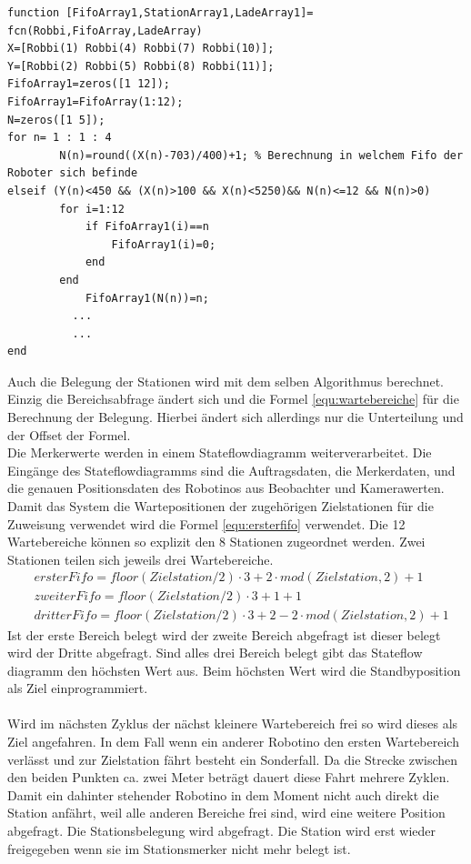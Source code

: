 \newpage
\begin{lstlisting}[caption={FIFO Merker},label=Fifomerker,basicstyle=\small]
function [FifoArray1,StationArray1,LadeArray1]= fcn(Robbi,FifoArray,LadeArray)
X=[Robbi(1) Robbi(4) Robbi(7) Robbi(10)];
Y=[Robbi(2) Robbi(5) Robbi(8) Robbi(11)];
FifoArray1=zeros([1 12]);
FifoArray1=FifoArray(1:12);
N=zeros([1 5]);
for n= 1 : 1 : 4
        N(n)=round((X(n)-703)/400)+1; % Berechnung in welchem Fifo der Roboter sich befinde
elseif (Y(n)<450 && (X(n)>100 && X(n)<5250)&& N(n)<=12 && N(n)>0)
        for i=1:12
            if FifoArray1(i)==n
                FifoArray1(i)=0;
            end
        end
            FifoArray1(N(n))=n;
          ...
          ...
end
\end{lstlisting}
Auch die Belegung der Stationen wird mit dem selben Algorithmus berechnet. Einzig die Bereichsabfrage ändert sich und die Formel \ref{equ:wartebereiche} für die Berechnung der Belegung. Hierbei ändert sich allerdings nur die Unterteilung und der Offset der Formel.\\
Die Merkerwerte werden in einem Stateflowdiagramm weiterverarbeitet. Die Eingänge des Stateflowdiagramms sind die Auftragsdaten, die Merkerdaten, und die genauen Positionsdaten des Robotinos aus Beobachter und Kamerawerten.
Damit das System die Wartepositionen der zugehörigen Zielstationen für die Zuweisung verwendet wird die Formel \ref{equ:ersterfifo} verwendet. Die 12 Wartebereiche können so explizit den 8 Stationen zugeordnet werden. Zwei Stationen teilen sich jeweils drei Wartebereiche.
\begin{align}
\label{equ:ersterfifo}
 &ersterFifo=floor(Zielstation/2)\cdot3+2 \cdot mod(Zielstation,2)+1\\
 &zweiterFifo=floor(Zielstation/2)\cdot 3+1+1\\
 &dritterFifo=floor(Zielstation/2)\cdot 3+2-2\cdot mod(Zielstation,2)+1
  \end{align} 
Ist der erste Bereich belegt wird der zweite Bereich abgefragt ist dieser belegt wird der Dritte abgefragt. Sind alles drei Bereich belegt gibt das Stateflow diagramm den höchsten Wert aus. Beim höchsten Wert wird die Standbyposition als Ziel einprogrammiert.\\
\\

Wird im nächsten Zyklus der nächst kleinere Wartebereich frei so wird dieses als Ziel angefahren. 
In dem Fall wenn ein anderer Robotino den ersten Wartebereich verlässt und zur Zielstation fährt besteht ein Sonderfall. Da die Strecke zwischen den beiden Punkten ca. zwei Meter beträgt dauert diese Fahrt mehrere Zyklen. Damit ein dahinter stehender Robotino in dem Moment nicht auch direkt die Station anfährt, weil alle anderen Bereiche frei sind, wird eine weitere Position abgefragt. Die Stationsbelegung wird abgefragt. 
Die Station wird erst wieder freigegeben wenn sie im Stationsmerker nicht mehr belegt ist.\\

